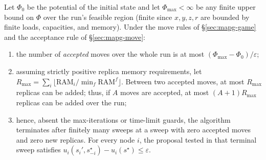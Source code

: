 \begin{theorem}
\label{thm:mapg-termination}
Let $\Phi_0$ be the potential of the initial state and let
$\Phi_{\max}<\infty$ be any finite upper bound on $\Phi$ over the run's
feasible region (finite since $x,y,z,r$ are bounded by finite loads,
capacities, and memory). Under the move rules of \S\ref{sec:mapg-game} and
the acceptance rule of \S\ref{sec:mapg-move}:
\begin{enumerate}
\item the number of \emph{accepted} moves over the whole run is at most
  $(\Phi_{\max}-\Phi_0)/\varepsilon$;
\item assuming strictly positive replica memory requirements, let
  $R_{\max}=\sum_i\lfloor \mathrm{RAM}_i/\min_f\mathrm{RAM}^f\rfloor$.
  Between two accepted moves, at most $R_{\max}$ replicas can be added;
  thus, if $A$ moves are accepted, at most $(A+1)R_{\max}$ replicas can
  be added over the run;
\item hence, absent the max-iterations or time-limit guards, the algorithm
  terminates after finitely many sweeps at a sweep with zero accepted moves
  and zero new replicas. For every node $i$, the proposal tested in that
  terminal sweep satisfies
  $u_i(s_i',s_{-i}^\star)-u_i(s^\star)\le\varepsilon$.
\end{enumerate}
\end{theorem}
